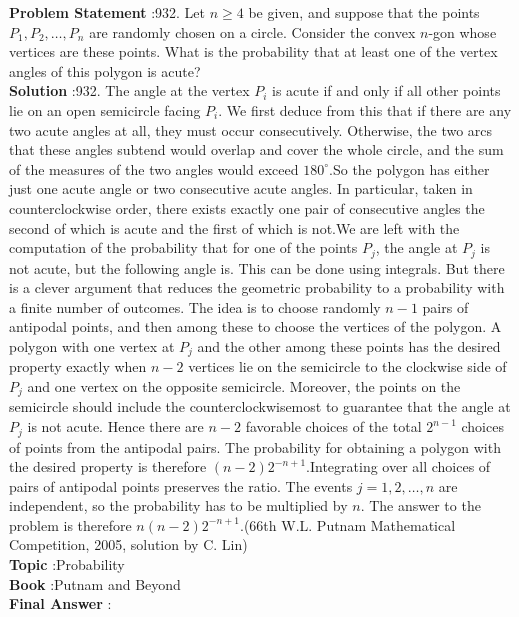 \documentclass[10pt]{article}
\begin{document}
\textbf{Problem Statement} :932. Let $n \geq 4$ be given, and suppose that the points $P_{1}, P_{2}, \ldots, P_{n}$ are randomly chosen on a circle. Consider the convex $n$-gon whose vertices are these points. What is the probability that at least one of the vertex angles of this polygon is acute?\\
\textbf{Solution} :932. The angle at the vertex $P_{i}$ is acute if and only if all other points lie on an open semicircle facing $P_{i}$. We first deduce from this that if there are any two acute angles at all, they must occur consecutively. Otherwise, the two arcs that these angles subtend would overlap and cover the whole circle, and the sum of the measures of the two angles would exceed $180^{\circ}$.So the polygon has either just one acute angle or two consecutive acute angles. In particular, taken in counterclockwise order, there exists exactly one pair of consecutive angles the second of which is acute and the first of which is not.We are left with the computation of the probability that for one of the points $P_{j}$, the angle at $P_{j}$ is not acute, but the following angle is. This can be done using integrals. But there is a clever argument that reduces the geometric probability to a probability with a finite number of outcomes. The idea is to choose randomly $n-1$ pairs of antipodal points, and then among these to choose the vertices of the polygon. A polygon with one vertex at $P_{j}$ and the other among these points has the desired property exactly when $n-2$ vertices lie on the semicircle to the clockwise side of $P_{j}$ and one vertex on the opposite semicircle. Moreover, the points on the semicircle should include the counterclockwisemost to guarantee that the angle at $P_{j}$ is not acute. Hence there are $n-2$ favorable choices of the total $2^{n-1}$ choices of points from the antipodal pairs. The probability for obtaining a polygon with the desired property is therefore $(n-2) 2^{-n+1}$.Integrating over all choices of pairs of antipodal points preserves the ratio. The events $j=1,2, \ldots, n$ are independent, so the probability has to be multiplied by $n$. The answer to the problem is therefore $n(n-2) 2^{-n+1}$.(66th W.L. Putnam Mathematical Competition, 2005, solution by C. Lin) \\
\textbf{Topic} :Probability\\
\textbf{Book} :Putnam and Beyond\\
\textbf{Final Answer} :\\
\end{document}
